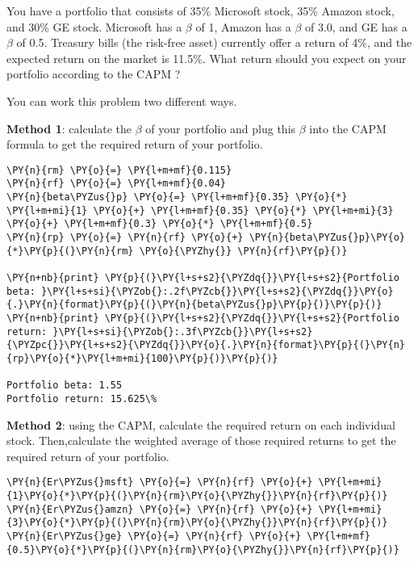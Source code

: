 \begin{Exercise}[title={(CAPM Practicle Application III)}]
You have a portfolio that consists of 35\% Microsoft stock, 35\% Amazon stock, and 30\% GE stock. Microsoft has a $\beta$ of 1, Amazon has a $\beta$ of 3.0, and GE has a $\beta$ of 0.5. Treasury bills (the risk-free asset) currently offer a return of 4\%, and the expected return on the market is 11.5\%. What return should you expect on your portfolio according to the CAPM ? 
\end{Exercise}
\begin{Answer}
You can work this problem two different ways.

\textbf{Method 1}: calculate the \(\beta\) of your portfolio and plug this
\(\beta\) into the CAPM formula to get the required return of your
portfolio.

\begin{tcolorbox}[size=fbox, boxrule=1pt, colback=cellbackground, colframe=cellborder]
\begin{Verbatim}[commandchars=\\\{\}]
\PY{n}{rm} \PY{o}{=} \PY{l+m+mf}{0.115}
\PY{n}{rf} \PY{o}{=} \PY{l+m+mf}{0.04}
\PY{n}{beta\PYZus{}p} \PY{o}{=} \PY{l+m+mf}{0.35} \PY{o}{*} \PY{l+m+mi}{1} \PY{o}{+} \PY{l+m+mf}{0.35} \PY{o}{*} \PY{l+m+mi}{3} \PY{o}{+} \PY{l+m+mf}{0.3} \PY{o}{*} \PY{l+m+mf}{0.5}
\PY{n}{rp} \PY{o}{=} \PY{n}{rf} \PY{o}{+} \PY{n}{beta\PYZus{}p}\PY{o}{*}\PY{p}{(}\PY{n}{rm} \PY{o}{\PYZhy{}} \PY{n}{rf}\PY{p}{)}
	
\PY{n+nb}{print} \PY{p}{(}\PY{l+s+s2}{\PYZdq{}}\PY{l+s+s2}{Portfolio beta: }\PY{l+s+si}{\PYZob{}:.2f\PYZcb{}}\PY{l+s+s2}{\PYZdq{}}\PY{o}{.}\PY{n}{format}\PY{p}{(}\PY{n}{beta\PYZus{}p}\PY{p}{)}\PY{p}{)}
\PY{n+nb}{print} \PY{p}{(}\PY{l+s+s2}{\PYZdq{}}\PY{l+s+s2}{Portfolio return: }\PY{l+s+si}{\PYZob{}:.3f\PYZcb{}}\PY{l+s+s2}{\PYZpc{}}\PY{l+s+s2}{\PYZdq{}}\PY{o}{.}\PY{n}{format}\PY{p}{(}\PY{n}{rp}\PY{o}{*}\PY{l+m+mi}{100}\PY{p}{)}\PY{p}{)}

Portfolio beta: 1.55
Portfolio return: 15.625\%
\end{Verbatim}
\end{tcolorbox}

\textbf{Method 2}: using the CAPM, calculate the required return on each
individual stock. Then,calculate the weighted average of those required
returns to get the required return of your portfolio.

\begin{tcolorbox}[breakable, size=fbox, boxrule=1pt, pad at break*=1mm,colback=cellbackground, colframe=cellborder]
\begin{Verbatim}[commandchars=\\\{\}]
\PY{n}{Er\PYZus{}msft} \PY{o}{=} \PY{n}{rf} \PY{o}{+} \PY{l+m+mi}{1}\PY{o}{*}\PY{p}{(}\PY{n}{rm}\PY{o}{\PYZhy{}}\PY{n}{rf}\PY{p}{)}
\PY{n}{Er\PYZus{}amzn} \PY{o}{=} \PY{n}{rf} \PY{o}{+} \PY{l+m+mi}{3}\PY{o}{*}\PY{p}{(}\PY{n}{rm}\PY{o}{\PYZhy{}}\PY{n}{rf}\PY{p}{)}
\PY{n}{Er\PYZus{}ge} \PY{o}{=} \PY{n}{rf} \PY{o}{+} \PY{l+m+mf}{0.5}\PY{o}{*}\PY{p}{(}\PY{n}{rm}\PY{o}{\PYZhy{}}\PY{n}{rf}\PY{p}{)}
	

\end{Verbatim}
\end{tcolorbox}
\end{Answer}

